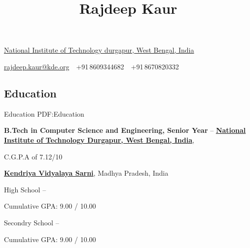 \documentclass[letterpaper,10pt,oneside]{article}
\newcommand{\CVAuthor}{Rajdeep Kaur}
\begin{document}

\title{\CVAuthor}

\begin{subtitle}
\href{https://www.google.co.in/maps/place/National+Institute+of+Technology/@23.550853,87.2882393,17z/data=!4m5!3m4!1s0x39f772081cede5e9:0x33fb9ccb243dfa5!8m2!3d23.550853!4d87.290428}
{National Institute of Technology durgapur, West Bengal, India}
\par
\href{mailto:rajdeep.kaur2009@gmail.com}
{rajdeep.kaur@kde.org}
\,\SubBulletSymbol\,
+91\,8609344682
\,\SubBulletSymbol\,
+91\,8670820332
\,\SubBulletSymbol\,

\end{subtitle}

\begin{body}


\section
{Education}
{Education}
{PDF:Education}

{\textbf{ B.Tech in Computer Science and Engineering, Senior Year}}
\hfill
{} --
\GapNoBreak
\href{http://www.nitdgp.ac.in/}
{\textbf{ National Institute of Technology Durgapur, West Bengal, India}},


\GapNoBreak
\BulletItem
C.G.P.A of  7.12/10 
\begin{detail}
\end{detail}

\GapNoBreak
\begin{detail}
\end{detail}

\BigGap
\href{}
{\textbf{Kendriya Vidyalaya Sarni}},
Madhya Pradesh, India

\GapNoBreak
\BulletItem
High School
\hfill
{} --
\begin{detail}
\SubBulletItem
Cumulative GPA: 9.00 / 10.00
\GapNoBreak

\BulletItem
Secondry School
\hfill
{} --
\begin{detail}
\SubBulletItem
Cumulative GPA: 9.00 / 10.00

\end{detail}




\end{detail}
\end{body}
\end{document}
